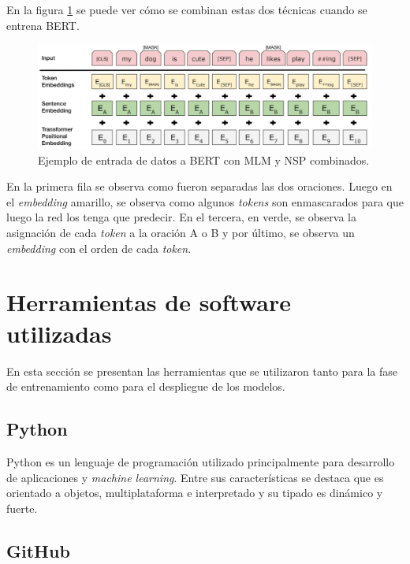 En la figura \ref{fig:bertinput} se puede ver cómo se combinan estas dos técnicas cuando se entrena BERT.

\begin{figure}[htbp]
	\centering
	\includegraphics[width=.8\textwidth]{./Figures/bertinput.png}
	\caption{Ejemplo de entrada de datos a BERT con MLM y NSP combinados\protect\footnotemark.}
	\label{fig:bertinput}
\end{figure}


En la primera fila se observa como fueron separadas las dos oraciones. Luego en el \textit{embedding} amarillo, se observa como algunos \textit{tokens} son enmascarados para que luego la red los tenga que predecir. En el tercera, en verde, se observa la asignación de cada \textit{token} a la oración A o B y por último, se observa un \textit{embedding} con el orden de cada \textit{token}.

\section{Herramientas de software utilizadas}

En esta sección se presentan las herramientas que se utilizaron tanto para la fase de entrenamiento como para el despliegue de los modelos.

\subsection{Python}

Python es un lenguaje de programación utilizado principalmente para desarrollo de aplicaciones y \textit{machine learning}. Entre sus características se destaca que es orientado a objetos, multiplataforma e interpretado y su tipado es dinámico y fuerte.

\subsection{GitHub}

